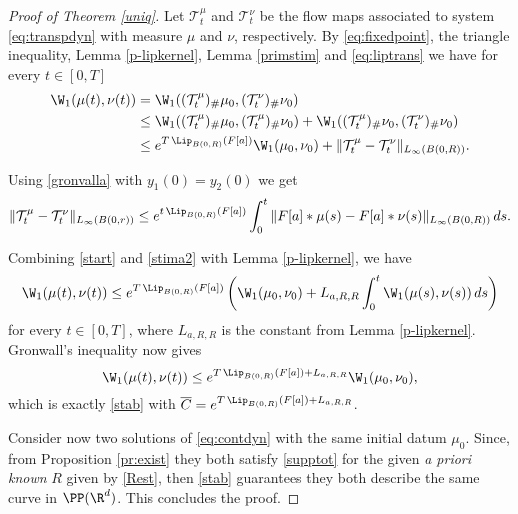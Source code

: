 \begin{proof}[Proof of Theorem \ref{uniq}]
Let  ${\mathcal T}^\mu_t$ and ${\mathcal T}^\nu_t$ be the flow maps associated to system \eqref{eq:transpdyn} with measure $\mu$ and $\nu$, respectively.
By \eqref{eq:fixedpoint}, the triangle inequality, Lemma \ref{p-lipkernel}, Lemma \ref{primstim} and \eqref{eq:liptrans} we have for every $t \in [0,T]$
\begin{align}
\begin{split}\label{start}
\W_1(\mu(t), \nu(t))&=\W_1(({\mathcal T}^\mu_t)_{\#} \mu_0, ({\mathcal T}^\nu_t)_{\#} \nu_0)  \\
&\le \W_1(({\mathcal T}^\mu_t)_{\#} \mu_0, ({\mathcal T}^\mu_t)_{\#} \nu_0) + \W_1(({\mathcal T}^\mu_t)_{\#} \nu_0, ({\mathcal T}^\nu_t)_{\#} \nu_0)\\
&\le e^{T \, \Lip_{B(0,R)}(F[a])} \W_1(\mu_0, \nu_0)+\|{\mathcal T}^\mu_t-{\mathcal T}^\nu_t\|_{L_\infty(B(0,R))}.
\end{split}
\end{align}

Using \eqref{gronvalla} with $y_1(0)= y_2(0)$ we get
\begin{equation}\label{stima2}
\|{\mathcal T}^\mu_t-{\mathcal T}^\nu_t\|_{L_\infty(B(0,r))}\le e^{t \, \Lip_{B(0,R)}(F[a])}\int_0^t \|F[a]* \mu(s)-F[a]* \nu(s)\|_{L_\infty(B(0,R))}\,ds.
\end{equation}

Combining \eqref{start} and \eqref{stima2} with Lemma \ref{p-lipkernel}, we have
$$
\W_1(\mu(t), \nu(t))\le e^{T \, \Lip_{B(0,R)}(F[a])} \left(\W_1(\mu_0, \nu_0)+ L_{a,R,R}\int_0^t \W_1(\mu(s), \nu(s)) \,ds\right)
$$
for every $t \in [0, T]$, where $L_{a,R,R}$ is the constant from Lemma \ref{p-lipkernel}. Gronwall's inequality now gives
$$
\W_1(\mu(t), \nu(t))\le e^{T \, \Lip_{B(0,R)}(F[a]) + L_{a,R,R}} \W_1(\mu_0, \nu_0),
$$
which is exactly \eqref{stab} with $\overline{C}= e^{T \, \Lip_{B(0,R)}(F[a]) + L_{a,R,R}}$.

Consider now two solutions of \eqref{eq:contdyn} with the same initial datum $\mu_0$. Since, from Proposition \ref{pr:exist} they both satisfy \eqref{supptot} for the given \textit{a priori known} $R$ given by \eqref{Rest}, then \eqref{stab} guarantees they both describe the same curve in $\PP(\R^d)$. This concludes the proof.
\end{proof}